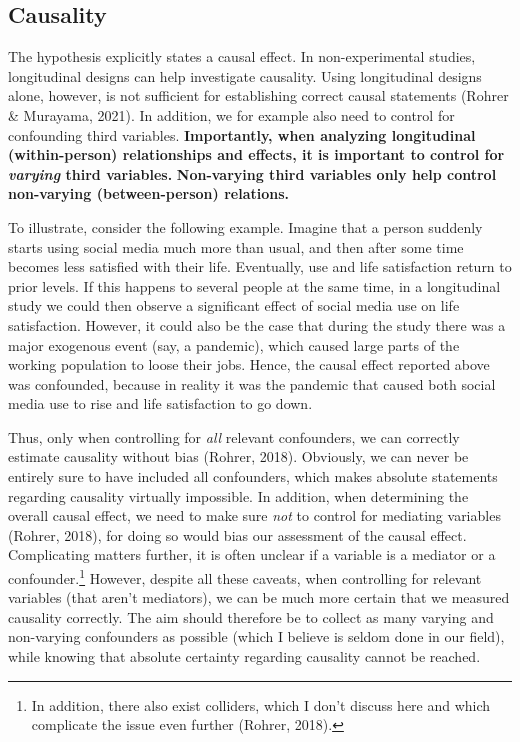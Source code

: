\documentclass[
  man,mask]{apa7}
\begin{document}
\hypertarget{causality}{%
\subsection{Causality}\label{causality}}

The hypothesis explicitly states a causal effect.
In non-experimental studies, longitudinal designs can help investigate causality.
Using longitudinal designs alone, however, is not sufficient for establishing correct causal statements (Rohrer \& Murayama, 2021).
In addition, we for example also need to control for confounding third variables.
\textbf{Importantly, when analyzing longitudinal (within-person) relationships and effects, it is important to control for \emph{varying} third variables.}
\textbf{Non-varying third variables only help control non-varying (between-person) relations.}

To illustrate, consider the following example.
Imagine that a person suddenly starts using social media much more than usual, and then after some time becomes less satisfied with their life.
Eventually, use and life satisfaction return to prior levels.
If this happens to several people at the same time, in a longitudinal study we could then observe a significant effect of social media use on life satisfaction.
However, it could also be the case that during the study there was a major exogenous event (say, a pandemic), which caused large parts of the working population to loose their jobs.
Hence, the causal effect reported above was confounded, because in reality it was the pandemic that caused both social media use to rise and life satisfaction to go down.

Thus, only when controlling for \emph{all} relevant confounders, we can correctly estimate causality without bias (Rohrer, 2018).
Obviously, we can never be entirely sure to have included all confounders, which makes absolute statements regarding causality virtually impossible.
In addition, when determining the overall causal effect, we need to make sure \emph{not} to control for mediating variables (Rohrer, 2018), for doing so would bias our assessment of the causal effect.
Complicating matters further, it is often unclear if a variable is a mediator or a confounder.\footnote{In addition, there also exist colliders, which I don't discuss here and which complicate the issue even further (Rohrer, 2018).}
However, despite all these caveats, when controlling for relevant variables (that aren't mediators), we can be much more certain that we measured causality correctly.
The aim should therefore be to collect as many varying and non-varying confounders as possible (which I believe is seldom done in our field), while knowing that absolute certainty regarding causality cannot be reached.
\end{document}
